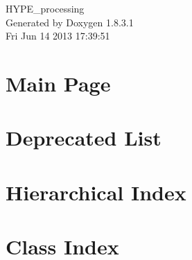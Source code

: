 \documentclass{book}
\begin{document}
\hypersetup{pageanchor=false,citecolor=blue}
\begin{titlepage}
\vspace*{7cm}
\begin{center}
{\Large H\-Y\-P\-E\-\_\-processing }\\
\vspace*{1cm}
{\large Generated by Doxygen 1.8.3.1}\\
\vspace*{0.5cm}
{\small Fri Jun 14 2013 17:39:51}\\
\end{center}
\end{titlepage}
\clearemptydoublepage
{}
\tableofcontents
\clearemptydoublepage
{}
\hypersetup{pageanchor=true,citecolor=blue}
\chapter{Main Page}
\label{index}\hypertarget{index}{}
\chapter{Deprecated List}
\label{deprecated}
\hypertarget{deprecated}{}

\chapter{Hierarchical Index}

\chapter{Class Index}

\end{document}
